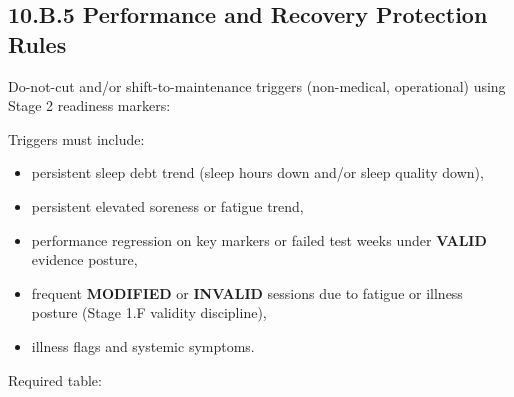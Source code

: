 \documentclass[10pt]{article}
\begin{document}
\newpage
\subsection*{10.B.5 Performance and Recovery Protection Rules}
{}

Do-not-cut and/or shift-to-maintenance triggers (non-medical, operational) using Stage 2 readiness markers:

Triggers must include:

\begin{itemize}
\item persistent sleep debt trend (sleep hours down and/or sleep quality down),
\item persistent elevated soreness or fatigue trend,
\item performance regression on key markers or failed test weeks under \textbf{VALID} evidence posture,
\item frequent \textbf{MODIFIED} or \textbf{INVALID} sessions due to fatigue or illness posture (Stage 1.F validity discipline),
\item illness flags and systemic symptoms.
\end{itemize}

Required table:

\begingroup
\scriptsize
\setlength{\tabcolsep}{2pt}
\renewcommand{\arraystretch}{1.12}
\end{document}
